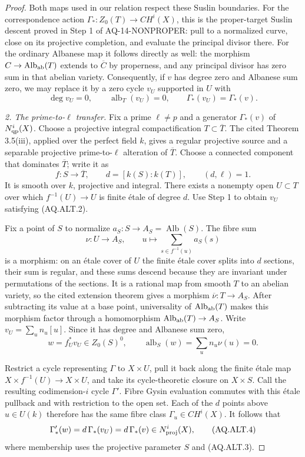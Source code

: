 \documentclass[11pt,a4paper]{article}
\theoremstyle{definition}\newtheorem{definition}[theorem]{Definition}
\theoremstyle{remark}\newtheorem{remark}[theorem]{Remark}
\begin{document}
\begin{proof}
Both maps used in our relation respect these Suslin
boundaries.  For the correspondence action
$\Gamma_*:Z_0(T)\to CH^i(X)$, this is the proper-target
Suslin descent proved in Step 1 of AQ-14-NONPROPER:
pull to a normalized curve, close on its projective
completion, and evaluate the principal divisor there.
For the ordinary Albanese map it follows directly as well:
the morphism $C\to\operatorname{Alb}_{\rm ab}(T)$
extends to $\overline C$ by properness, and any principal
divisor has zero sum in that abelian variety.
Consequently, if $v$ has degree zero and Albanese sum zero,
we may replace it by a zero cycle $v_U$ supported in $U$
with
\[
 \deg v_U=0,\qquad\operatorname{alb}_T(v_U)=0,
 \qquad \Gamma_*(v_U)=\Gamma_*(v).                \tag{AQ.ALT.2}
\]

\emph{2. The prime-to-$\ell$ transfer.}
Fix a prime $\ell\ne p$ and a generator
$\Gamma_*(v)$ of $N^i_{\rm qp}(X)$.
Choose a projective integral compactification
$T\subset\overline T$.
The cited Theorem 3.5(iii), applied over the perfect field
$k$, gives a regular projective source and a separable
projective prime-to-$\ell$ alteration of $\overline T$.
Choose a connected component that dominates
$\overline T$; write it as
\[
 f:S\longrightarrow\overline T,\qquad
 d=[k(S):k(T)],\qquad (d,\ell)=1.
\]
It is smooth over $k$, projective and integral.
There exists a nonempty open $U\subset T$ over which
$f^{-1}(U)\to U$ is finite \'etale of degree $d$.
Use Step 1 to obtain $v_U$ satisfying (AQ.ALT.2).

Fix a point of $S$ to normalize
$a_S:S\to A_S=\operatorname{Alb}(S)$.
The fibre sum
\[
 \nu:U\longrightarrow A_S,\qquad
 u\longmapsto\sum_{s\in f^{-1}(u)}a_S(s)
\]
is a morphism: on an \'etale cover of $U$ the finite
\'etale cover splits into $d$ sections, their sum is
regular, and these sums descend because they are
invariant under permutations of the sections.
It is a rational map from smooth $T$ to an abelian
variety, so the cited extension theorem gives a morphism
$\overline\nu:T\to A_S$.
After subtracting its value at a base point, universality
of $\operatorname{Alb}_{\rm ab}(T)$ makes this morphism
factor through a homomorphism
$\operatorname{Alb}_{\rm ab}(T)\to A_S$.
Write $v_U=\sum_u n_u[u]$.  Since it has degree and Albanese sum zero,
\[
 w=f_U^*v_U\in Z_0(S)^0,
 \qquad \operatorname{alb}_S(w)
        =\sum_u n_u\nu(u)=0.                       \tag{AQ.ALT.3}
\]

Restrict a cycle representing $\Gamma$ to $X\times U$,
pull it back along the finite \'etale map
$X\times f^{-1}(U)\to X\times U$, and take its
cycle-theoretic closure on $X\times S$.
Call the resulting codimension-$i$ cycle $\Gamma'$.
Fibre Gysin evaluation commutes with this \'etale
pullback and with restriction to the open set.
Each of the $d$ points above $u\in U(k)$ therefore
has the same fibre class $\Gamma_u\in CH^i(X)$.
It follows that
\[
 \Gamma'_*(w)=d\,\Gamma_*(v_U)
             =d\,\Gamma_*(v)
             \in N^i_{\rm proj}(X),               \tag{AQ.ALT.4}
\]
where membership uses the projective parameter $S$
and (AQ.ALT.3).


\end{proof}
\end{document}

